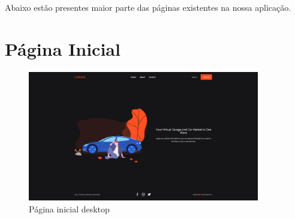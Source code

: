 \documentclass[a4paper]{report}
\begin{document}
Abaixo estão presentes maior parte das páginas existentes na nossa aplicação.

\section{Página Inicial}

\begin{figure}[H]
    \centering
    \includegraphics[width=0.9\textwidth]{images/homepage.png}
    \caption{Página inicial desktop}
\end{figure}
\end{document}
